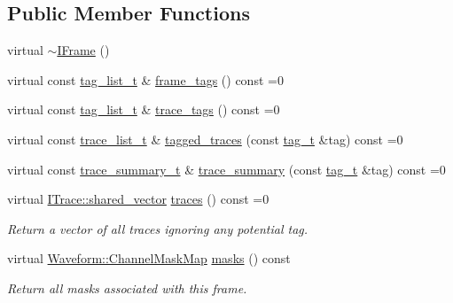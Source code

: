 \subsection*{Public Member Functions}
\begin{DoxyCompactItemize}
\item 
virtual \hyperlink{class_wire_cell_1_1_i_frame_a7f25061ae34cc3ec3b3a18805cde79bb}{$\sim$\+I\+Frame} ()
\item 
virtual const \hyperlink{class_wire_cell_1_1_i_frame_ab34485d40e352997c21b9ec99504ba7c}{tag\+\_\+list\+\_\+t} \& \hyperlink{class_wire_cell_1_1_i_frame_a4de75840db5d079b285e29c0e7f081e5}{frame\+\_\+tags} () const =0
\item 
virtual const \hyperlink{class_wire_cell_1_1_i_frame_ab34485d40e352997c21b9ec99504ba7c}{tag\+\_\+list\+\_\+t} \& \hyperlink{class_wire_cell_1_1_i_frame_aac1f359b2e383089e718853d359f8a97}{trace\+\_\+tags} () const =0
\item 
virtual const \hyperlink{class_wire_cell_1_1_i_frame_a12f08adf79d21cb9b4862a16193fda8f}{trace\+\_\+list\+\_\+t} \& \hyperlink{class_wire_cell_1_1_i_frame_ae5d922a082d23583c7b6dff24c1116ed}{tagged\+\_\+traces} (const \hyperlink{class_wire_cell_1_1_i_frame_ae206ba618e10f398625dfeb675a4215a}{tag\+\_\+t} \&tag) const =0
\item 
virtual const \hyperlink{class_wire_cell_1_1_i_frame_ad65f8b090c2607591e44d7b40777517e}{trace\+\_\+summary\+\_\+t} \& \hyperlink{class_wire_cell_1_1_i_frame_a4b2841b0245453235f223be1c67c2ff5}{trace\+\_\+summary} (const \hyperlink{class_wire_cell_1_1_i_frame_ae206ba618e10f398625dfeb675a4215a}{tag\+\_\+t} \&tag) const =0
\item 
virtual \hyperlink{class_wire_cell_1_1_i_data_a6edac35e7dd886018740993b28c7ca1e}{I\+Trace\+::shared\+\_\+vector} \hyperlink{class_wire_cell_1_1_i_frame_aff349734fe22aafed42c3dc0b7553f64}{traces} () const =0
\begin{DoxyCompactList}\small\item\em Return a vector of all traces ignoring any potential tag. \end{DoxyCompactList}\item 
virtual \hyperlink{namespace_wire_cell_1_1_waveform_a18b9ae61c858e340252ba3ac83ac3bc0}{Waveform\+::\+Channel\+Mask\+Map} \hyperlink{class_wire_cell_1_1_i_frame_a577dd9839b5239799ee8c8e508b3a9e4}{masks} () const
\begin{DoxyCompactList}\small\item\em Return all masks associated with this frame. \end{DoxyCompactList}\item 

\end{DoxyCompactItemize}

